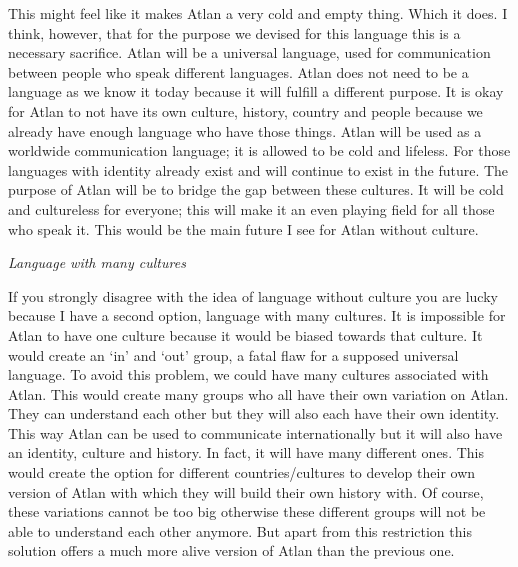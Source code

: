 This might feel like it makes Atlan a very cold and empty thing. Which it does. I think, however, that for the purpose we devised for this language this is a necessary sacrifice. Atlan will be a universal language, used for communication between people who speak different languages. Atlan does not need to be a language as we know it today because it will fulfill a different purpose. It is okay for Atlan to not have its own culture, history, country and people because we already have enough language who have those things. Atlan will be used as a worldwide communication language; it is allowed to be cold and lifeless. For those languages with identity already exist and will continue to exist in the future. The purpose of Atlan will be to bridge the gap between these cultures. It will be cold and cultureless for everyone; this will make it an even playing field for all those who speak it. This would be the main future I see for Atlan without culture.  

\noindent \textit{Language with many cultures} 

If you strongly disagree with the idea of language without culture you are lucky because I have a second option, language with many cultures. It is impossible for Atlan to have one culture because it would be biased towards that culture. It would create an ‘in’ and ‘out’ group, a fatal flaw for a supposed universal language. To avoid this problem, we could have many cultures associated with Atlan. This would create many groups who all have their own variation on Atlan. They can understand each other but they will also each have their own identity. This way Atlan can be used to communicate internationally but it will also have an identity, culture and history. In fact, it will have many different ones. This would create the option for different countries/cultures to develop their own version of Atlan with which they will build their own history with. Of course, these variations cannot be too big otherwise these different groups will not be able to understand each other anymore. But apart from this restriction this solution offers a much more alive version of Atlan than the previous one.  

